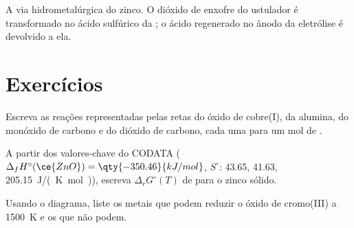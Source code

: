 \begin{omfigure}

{\small A via hidrometalúrgica do zinco. O dióxido de enxofre do ustulador
é transformado no ácido sulfúrico da ; o ácido regenerado no
ânodo da eletrólise é devolvido a ela.}
\end{omfigure}

\section{Exercícios}

\begin{exercise}[$\star$]\label{exo:b2:ellingham:1}
Escreva as reações representadas pelas retas do óxido de cobre(I), da alumina,
do monóxido de carbono e do dióxido de carbono, cada uma para um mol de .
\end{exercise}

\begin{exercise}[$\star$]\label{exo:b2:ellingham:2}
A partir dos valores-chave do CODATA ($\Delta_f H^\circ(\ce{ZnO}) = \qty{-350.46}{kJ/mol}$,
$S^\circ$:  43.65,  41.63,  \qty{205.15}{J/(K.mol)}),
escreva $\Delta_r G^\circ(T)$ de  para o zinco sólido.
\end{exercise}

\begin{exercise}[$\star$]\label{exo:b2:ellingham:3}
Usando o diagrama, liste os metais que podem reduzir o óxido de cromo(III) a
\qty{1500}{K} e os que não podem.
\end{exercise}

